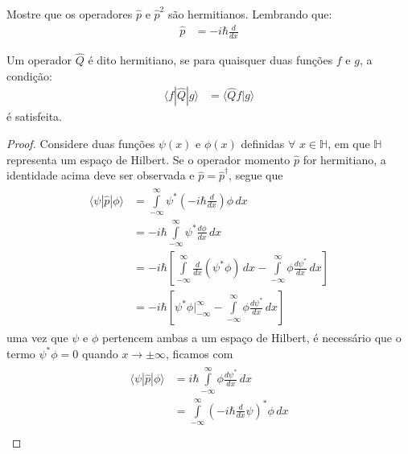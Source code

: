 	 \begin{prob}
		 Mostre que os operadores $\hat{p}$ e $\hat{p}^{2}$ são hermitianos. Lembrando que:
		 \begin{align}
			 \hat{p}&=-i \hbar \frac{d}{dx}
		 \end{align}
		 \begin{sol}
		 	Um operador $\hat{Q}$ é dito hermitiano, se para quaisquer duas funções $f$ e $g$, a condição:
			\begin{align}
				\langle{f}|\hat{Q}|{g}\rangle &= \langle{\hat{Q}f}|{g}\rangle
			\end{align}
			é satisfeita.
		 \end{sol}
		 \begin{proof}
			 Considere duas funções $\psi(x)$ e $\phi(x)$ definidas $\forall$ $x\in{\mathbb{H}}$, em que $\mathbb{H}$ representa um espaço de Hilbert. Se o operador momento $\hat{p}$ for hermitiano, a identidade acima deve ser observada e $\hat{p}=\hat{p}^{\dag}$, segue que
			 \begin{align}
				 \begin{split}
					 \langle{\psi}|\hat{p}|{\phi}\rangle &= \int\limits_{-\infty}^{\infty} \psi^{*}\left(-i \hbar{\frac{d}{dx}}\right) \phi\,d{x}\\
																							 &= -i \hbar\int\limits_{-\infty}^{\infty} \psi^{*}\frac{d \phi}{dx}\,d{x}\\
																							 &= -i \hbar \left[\int\limits_{-\infty}^{\infty}\frac{d}{dx}\left(\psi^{*}\phi\right)\,d{x}-\int\limits_{-\infty}^{\infty} \phi \frac{d \psi^{*}}{dx}\,d{x}\right]\\
																							 &= -i \hbar{}\left[\psi^{*} \phi\Bigg|_{-\infty}^{\infty}-\int\limits_{-\infty}^{\infty} \phi \frac{d \psi^{*}}{dx}\,d{x}\right]
				 \end{split}
			 \end{align}
			 uma vez que $\psi$ e $\phi$ pertencem ambas a um espaço de Hilbert, é necessário que o termo $\psi^{*} \phi=0$ quando $x\to \pm\infty$, ficamos com
			 \begin{align}
				 \begin{split}
					 \langle{\psi}|\hat{p}|{\phi}\rangle &= i \hbar{\int\limits_{-\infty}^{\infty} \phi \frac{d \psi^{*}}{dx}\,d{x}}\\
																							 &= \int\limits_{-\infty}^{\infty}\left(-i \hbar{}\frac{d}{dx} \psi\right)^{*} \phi\,d{x}\\

\end{split}
\end{align}
\end{proof}
\end{prob}

